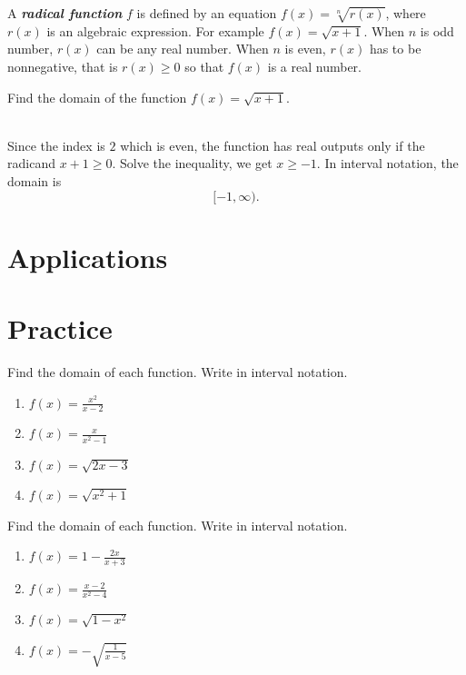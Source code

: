 \documentclass[en,12pt]{elegantbook}
\providecommand{\tightlist}{%
  \setlength{\itemsep}{0pt}\setlength{\parskip}{0pt}}
\let\BeginKnitrBlock\begin \let\EndKnitrBlock\end
\begin{document}
A \textbf{\emph{radical function}} \(f\) is defined by an equation \(f(x)=\sqrt[n]{r(x)}\), where \(r(x)\) is an algebraic expression. For example \(f(x)=\sqrt{x+1}\). When \(n\) is odd number, \(r(x)\) can be any real number. When \(n\) is even, \(r(x)\) has to be nonnegative, that is \(r(x)\geq 0\) so that \(f(x)\) is a real number.

\BeginKnitrBlock{example}
\protect\hypertarget{exm:unnamed-chunk-295}{}{\label{exm:unnamed-chunk-295} }
Find the domain of the function \(f(x)=\sqrt{x+1}\).
\EndKnitrBlock{example}

\BeginKnitrBlock{solution}
{}\\

Since the index is \(2\) which is even, the function has real outputs only if the radicand \(x+1\geq 0\).
Solve the inequality, we get \(x\geq -1\). In interval notation, the domain is
\[
[-1,\infty).
\]
\EndKnitrBlock{solution}

\hypertarget{applications}{%
\section{Applications}\label{applications}}

\hypertarget{practice-13}{%
\section{Practice}\label{practice-13}}

\BeginKnitrBlock{exercise}
\protect\hypertarget{exr:unnamed-chunk-297}{}{\label{exr:unnamed-chunk-297} }
Find the domain of each function. Write in interval notation.

\begin{enumerate}
\def\labelenumi{\arabic{enumi}.}
\tightlist
\item
  \(f(x)=\frac{x^2}{x-2}\)
\item
  \(f(x)=\frac{x}{x^2-1}\)
\item
  \(f(x)=\sqrt{2x-3}\)
\item
  \(f(x)=\sqrt{x^2+1}\)\hfill\null
\end{enumerate}
\EndKnitrBlock{exercise}

\BeginKnitrBlock{exercise}
\protect\hypertarget{exr:unnamed-chunk-298}{}{\label{exr:unnamed-chunk-298} }
Find the domain of each function. Write in interval notation.

\begin{enumerate}
\def\labelenumi{\arabic{enumi}.}
\tightlist
\item
  \(f(x)=1-\frac{2x}{x+3}\)
\item
  \(f(x)=\frac{x-2}{x^2-4}\)
\item
  \(f(x)=\sqrt{1-x^2}\)
\item
  \(f(x)=-\sqrt{\frac{1}{x-5}}\)\hfill\null
\end{enumerate}
\EndKnitrBlock{exercise}
\end{document}
